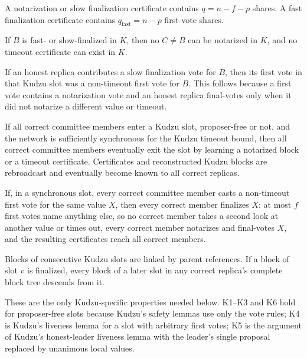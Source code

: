 \documentclass[11pt]{article}
\theoremstyle{remark}
\begin{document}
\begin{description}[leftmargin=2.4em,labelindent=0em]
\item[K1 (certificate thresholds).]
A notarization or slow finalization certificate contains $q=n-f-p$ shares. A fast finalization certificate contains $q_{\mathrm{fast}}=n-p$ first-vote shares.

\item[K2 (finalization incompatibility).]
If $B$ is fast- or slow-finalized in $K$, then no $C\ne B$ can be notarized in $K$, and no timeout certificate can exist in $K$.

\item[K3 (honest final voters are non-timeout first voters).]
If an honest replica contributes a slow finalization vote for $B$, then its first vote in that Kudzu slot was a non-timeout first vote for $B$. This follows because a first vote contains a notarization vote and an honest replica final-votes only when it did not notarize a different value or timeout.

\item[K4 (slot exit under synchrony).]
If all correct committee members enter a Kudzu slot, proposer-free or not, and the network is sufficiently synchronous for the Kudzu timeout bound, then all correct committee members eventually exit the slot by learning a notarized block or a timeout certificate. Certificates and reconstructed Kudzu blocks are rebroadcast and eventually become known to all correct replicas.

\item[K5 (unanimous first votes finalize).]
If, in a synchronous slot, every correct committee member casts a non-timeout first vote for the same value $X$, then every correct member finalizes $X$: at most $f$ first votes name anything else, so no correct member takes a second look at another value or times out, every correct member notarizes and final-votes $X$, and the resulting certificates reach all correct members.

\item[K6 (chain safety).]
Blocks of consecutive Kudzu slots are linked by parent references. If a block of slot $v$ is finalized, every block of a later slot in any correct replica's complete block tree descends from it.
\end{description}

These are the only Kudzu-specific properties needed below. K1--K3 and K6 hold for proposer-free slots because Kudzu's safety lemmas use only the vote rules; K4 is Kudzu's liveness lemma for a slot with arbitrary first votes; K5 is the argument of Kudzu's honest-leader liveness lemma with the leader's single proposal replaced by unanimous local values.
\end{document}
